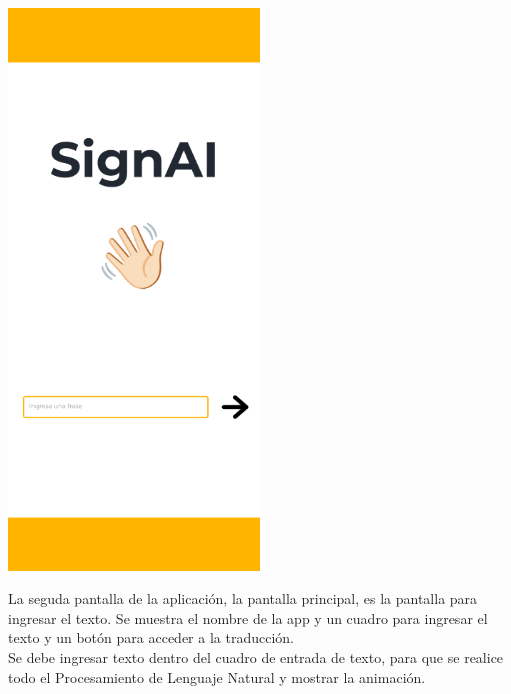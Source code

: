 \begin{center}
    \includegraphics[width=0.5\textwidth]{Images/Cap 3/Pantalla2.png}
\end{center}
 
La seguda pantalla de la aplicación, la pantalla principal, es la pantalla para ingresar el texto. Se muestra el nombre de la app y  un cuadro para ingresar el texto y un botón para acceder a la traducción.\\

Se debe ingresar texto dentro del cuadro de entrada de texto, para que se realice todo el Procesamiento de Lenguaje Natural y mostrar la animación.


